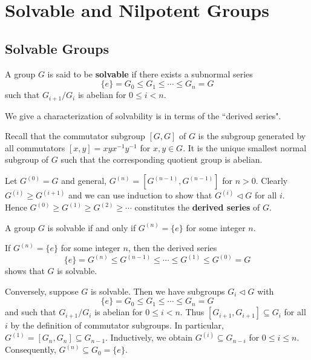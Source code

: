 \section{Solvable and Nilpotent Groups}
\subsection{Solvable Groups}
\begin{definition}
	A group $G$ is said to be \textbf{solvable} if there exists a subnormal series
	\begin{equation*}
		\{e\} = G_0 \leq G_1 \leq \cdots \leq G_n = G
	\end{equation*}
	such that $
		G_{i+1}/G_{i}$ is abelian
	for $0\leq i<n$.
\end{definition}


We give a characterization of solvability is in terms of the ``derived series".  

Recall that the commutator subgroup $[G,G]$ of $G$ is the subgroup generated by all commutators $[x, y] = xy  x^{-1} y^{-1}$ for $x, y \in G$. It is the unique smallest normal subgroup of $G$ such that the corresponding quotient group is abelian.

Let  $G^{(0)} = G$ and  general, $G^{(n)} = [G^{(n-1)},G^{(n-1)}]$ for $n > 0$. Clearly $G^{(i)} \geq G^{(i+1)}$ and we can use induction to show that $G^{(i)}\lhd G$ for all $i$. Hence $G^{(0)} \geq G^{(1)} \geq G^{(2)} \geq \cdots$ constitutes the \textbf{derived series}  of $G$.

\begin{theorem} \label{thm-solvable}
	A group $G$ is solvable if and only if  $G^{(n)} = \{e\}$ for some integer $n$.
\end{theorem}
\begin{sketch}
	If $G^{(n)} = \{e\}$ for some integer $n$, then the derived series
	$$\{e\} = G^{(n)} \leq G^{(n-1)} \leq \cdots \leq G^{(1)} \leq G^{(0)} = G$$
	shows that $G$ is solvable.
	
	Conversely, suppose $G$ is solvable. Then we have subgroups $G_i \lhd G$ with
	$$\{e\} = G_0 \leq G_1 \leq\cdots \leq G_n = G$$
	and such that $G_{i+1}/G_i$ is abelian for $0 \leq i < n$. Thus $[G_{i+1},G_{i+1}] \subseteq G_i$ for all $i$ by the definition of commutator subgroups. In particular, $G^{(1)} = [G_n,G_n] \subseteq G_{n-1}$. Inductively, we obtain $G^{(i)} \subseteq G_{n-i}$ for $0 \leq i \leq n$. Consequently, $G^{(n)} \subseteq G_0 = \{e\}$.
\end{sketch}

